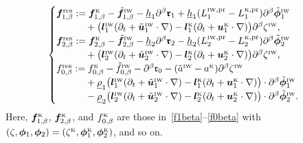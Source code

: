 \documentclass[11pt,leqno]{article}
\numberwithin{equation}{section}
\numberwithin{figure}{section}
\begin{document}
\[
\begin{cases}
 \bm{f}_{1,\beta}^\mathrm{res} := \bm{f}_{1,\beta}^{\mbox{\rm\tiny K}} - \tilde{\bm{f}}_{1,\beta}^{\mbox{\rm\tiny IW}}
  - \underline{h}_1\partial^\beta\bm{\mathfrak{r}}_1
  + \underline{h}_1( L_1^{\mbox{\rm\tiny IW},\mathrm{pr}} - L_1^{\mbox{\rm\tiny K},\mathrm{pr}} )
   \partial^\beta\tilde{\bm{\phi}}_1^{\mbox{\rm\tiny IW}} \\
 \qquad\quad{}
  +\bigl(\bm{l}_1^{\mbox{\rm\tiny IW}}(\partial_t+\tilde{\bm{u}}_1^{\mbox{\rm\tiny IW}}\cdot\nabla)
   - \bm{l}_1^{\mbox{\rm\tiny K}}(\partial_t+\bm{u}_1^{\mbox{\rm\tiny K}}\cdot\nabla) \bigr)
   \partial^\beta\zeta^{\mbox{\rm\tiny IW}}, \\
 \bm{f}_{2,\beta}^\mathrm{res} := \bm{f}_{2,\beta}^{\mbox{\rm\tiny K}} - \tilde{\bm{f}}_{2,\beta}^{\mbox{\rm\tiny IW}}
  - \underline{h}_2\partial^\beta\bm{\mathfrak{r}}_2
  - \underline{h}_2( L_2^{\mbox{\rm\tiny IW},\mathrm{pr}} - L_2^{\mbox{\rm\tiny K},\mathrm{pr}} )
   \partial^\beta\tilde{\bm{\phi}}_2^{\mbox{\rm\tiny IW}} \\
 \qquad\quad{}
  +\bigl(\bm{l}_2^{\mbox{\rm\tiny IW}}(\partial_t+\tilde{\bm{u}}_2^{\mbox{\rm\tiny IW}}\cdot\nabla)
   - \bm{l}_2^{\mbox{\rm\tiny K}}(\partial_t+\bm{u}_2^{\mbox{\rm\tiny K}}\cdot\nabla) \bigr)
   \partial^\beta\zeta^{\mbox{\rm\tiny IW}}, \\
 f_{0,\beta}^\mathrm{res} := f_{0,\beta}^{\mbox{\rm\tiny K}} - \tilde{f}_{0,\beta}^{\mbox{\rm\tiny IW}}
  - \partial^\beta \mathfrak{r}_0 - (\tilde{a}^{\mbox{\rm\tiny IW}}
  - a^{\mbox{\rm\tiny K}})\partial^\beta \zeta^{\mbox{\rm\tiny IW}} \\
 \qquad\quad{}
 + \underline{\rho}_1\bigl( {\bm l}_1^{\mbox{\rm\tiny IW}} ( \partial_t+\tilde{\bm{u}}_1^{\mbox{\rm\tiny IW}}\cdot\nabla )
  - {\bm l}_1^{\mbox{\rm\tiny K}} ( \partial_t+\bm{u}_1^{\mbox{\rm\tiny K}}\cdot\nabla ) \bigr)\cdot
  \partial^\beta \tilde{\bm{\phi}}_1^{\mbox{\rm\tiny IW}} \\
 \qquad\quad{}
 - \underline{\rho}_2\bigl( {\bm l}_2^{\mbox{\rm\tiny IW}} ( \partial_t+\tilde{\bm{u}}_2^{\mbox{\rm\tiny IW}}\cdot\nabla )
  - {\bm l}_2^{\mbox{\rm\tiny K}} ( \partial_t+\bm{u}_2^{\mbox{\rm\tiny K}}\cdot\nabla ) \bigr)\cdot
  \partial^\beta \tilde{\bm{\phi}}_2^{\mbox{\rm\tiny IW}}.
\end{cases}
\]
%
Here, $\bm{f}_{1,\beta}^{\mbox{\rm\tiny K}}$, $\bm{f}_{2,\beta}^{\mbox{\rm\tiny K}}$, and $f_{0,\beta}^{\mbox{\rm\tiny K}}$ 
are those in~\eqref{f1beta}--\eqref{f0beta} with $(\zeta,\bm{\phi}_1,\bm{\phi}_2)
=(\zeta^{\mbox{\rm\tiny K}},\bm{\phi}_1^{\mbox{\rm\tiny K}},\bm{\phi}_2^{\mbox{\rm\tiny K}})$, and so on. 
\end{document}
